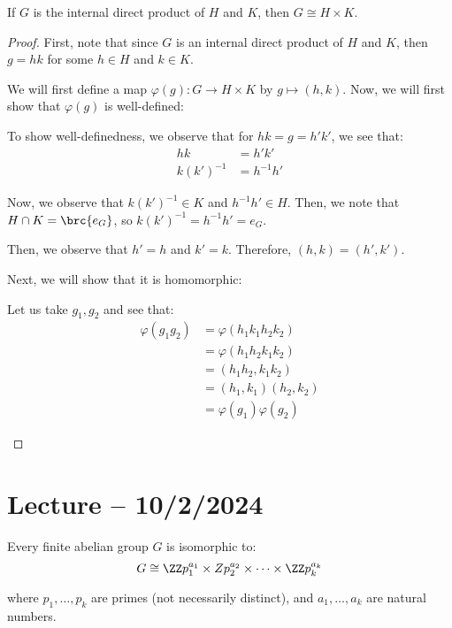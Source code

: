 \documentclass[openany]{book}
\begin{document}
\begin{thm}
	If $G$ is the internal direct product of $H$ and $K$, then $G \cong H \times K$.
\end{thm}
\begin{proof}
	First, note that since $G$ is an internal direct product of $H$ and $K$, then $g = hk$ for some $h \in H$ and $k \in K$.
	
	We will first define a map $\varphi(g) : G \rightarrow H \times K$ by $g \mapsto (h, k)$. Now, we will first show that $\varphi(g)$ is well-defined:
	\begin{innerproof}
		 To show well-definedness, we observe that for $hk=g=h'k'$, we see that:
		\begin{align*}
			hk &= h'k' \\
			k(k')^{-1} &= h^{-1}h'
		\end{align*}
		
		Now, we observe that $k(k')^{-1} \in K$ and $h^{-1}h' \in H$. Then, we note that $H \cap K = \brc{e_G}$, so $k(k')^{-1} = h^{-1}h' = e_G$.
		
		Then, we observe that $h' = h$ and $k' = k$. Therefore, $(h, k) = (h', k')$.
	\end{innerproof}

	Next, we will show that it is homomorphic:
	\begin{innerproof}
		Let us take $g_1, g_2$ and see that:
		\begin{align*}
			\varphi(g_1g_2) &= \varphi(h_1k_1h_2k_2) \\
			&= \varphi(h_1h_2k_1k_2) \\
			&= (h_1h_2, k_1k_2) \\
			&= (h_1, k_1)(h_2, k_2) \\
			&= \varphi(g_1)\varphi(g_2)
		\end{align*}
	\end{innerproof}
\end{proof}

\section{Lecture -- 10/2/2024}
\begin{thm}
	Every finite abelian group $G$ is isomorphic to:
	\begin{equation*}
		G \cong \ZZ p_1^{a_1} \times Z p_2^{a_2} \times \cdots \times \ZZ p_k^{a_k}
	\end{equation*}

	where $p_1, \ldots, p_k$ are primes (not necessarily distinct), and $a_1, \ldots, a_k$ are natural numbers.
\end{thm}
\end{document}
